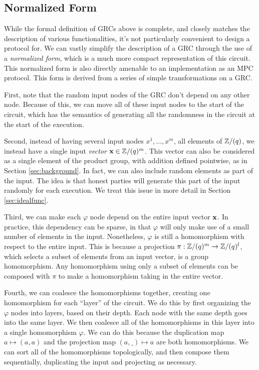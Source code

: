 \subsection{Normalized Form}

While the formal definition of GRCs above is complete, and closely
matches the description of various functionalities, it's not
particularly convenient to design a protocol for.
We can vastly simplify the description of a GRC through the use
of a \emph{normalized form}, which is a much more compact representation
of this circuit.
This normalized form is also directly amenable to an implementation
as an MPC protocol.
This form is derived from a series of simple transformations on
a GRC.

First, note that the random input nodes of the GRC don't depend on
any other node. Because of this, we can move all of these input nodes
to the start of the circuit, which has the semantics of generating
all the randomness in the circuit at the start of the execution.

Second, instead of having several input nodes $x^1, \ldots, x^m$,
all elements of $\mathbb{Z}/(q)$, we
instead have a single input \emph{vector} $\textbf{x} \in \mathbb{Z}/(q)^m$.
This vector can also be considered as a single element of the product
group, with addition defined pointwise, as in Section \ref{sec:background}.
In fact, we can also include random elements as part of the input.
The idea is that honest parties will generate this part of the input
randomly for each execution.
We treat this issue in more detail in Section \ref{sec:idealfunc}.

Third, we can make each $\varphi$ node depend on the entire
input vector $\textbf{x}$.
In practice, this dependency can be sparse, in that $\varphi$
will only make use of a small number of elements in the input.
Nonetheless, $\varphi$ is still a homomorphism with respect
to the entire input.
This is because a projection $\pi : \mathbb{Z}/(q)^m \to \mathbb{Z}/(q)^l$, which selects
a subset of elements from an input vector, is a group homomorphism.
Any homomorphism using only a subset of elements can be composed with $\pi$
to make a homomorphism taking in the entire vector.

Fourth, we can coalesce the homomorphisms together, creating one
homomorphism for each ``layer'' of the circuit.
We do this by first organizing the $\varphi$ nodes into layers,
based on their depth.
Each node with the same depth goes into the same layer.
We then coalesce all of the homomorphisms in this layer into
a single homomorphism $\varphi$.
We can do this because the duplication map $a \mapsto (a, a)$
and the projection map $(a, \_) \mapsto a$ are both homomorphisms.
We can sort all of the homomorphisms topologically, and then compose
them sequentially, duplicating the input and projecting as necessary.

